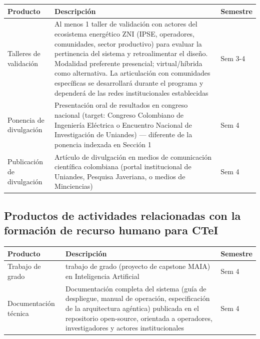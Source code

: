 \documentclass[12pt,letterpaper]{article}
\begin{document}
\begin{longtable}{>{\raggedright\arraybackslash}p{3.5cm} >{\raggedright\arraybackslash}p{9cm} >{\centering\arraybackslash}p{2cm}}
\toprule
\textbf{Producto} & \textbf{Descripci\'on} & \textbf{Semestre} \\
\midrule
\endhead
Talleres de validaci\'on & Al menos 1 taller de validaci\'on con actores del ecosistema energ\'etico ZNI (IPSE, operadores, comunidades, sector productivo) para evaluar la pertinencia del sistema y retroalimentar el dise\~no. Modalidad preferente presencial; virtual/h\'ibrida como alternativa. La articulaci\'on con comunidades espec\'ificas se desarrollar\'a durante el programa y depender\'a de las redes institucionales establecidas & Sem 3-4 \\
\midrule
Ponencia de divulgaci\'on & Presentaci\'on oral de resultados en congreso nacional (target: Congreso Colombiano de Ingenier\'ia El\'ectrica o Encuentro Nacional de Investigaci\'on de Uniandes) --- diferente de la ponencia indexada en Secci\'on 1 & Sem 4 \\
\midrule
Publicaci\'on de divulgaci\'on & Art\'iculo de divulgaci\'on en medios de comunicaci\'on cient\'ifica colombiana (portal institucional de Uniandes, Pesquisa Javeriana, o medios de Minciencias) & Sem 4 \\
\bottomrule
\end{longtable}

\subsection{Productos de actividades relacionadas con la formaci\'on de recurso humano para CTeI}

\begin{longtable}{>{\raggedright\arraybackslash}p{3.5cm} >{\raggedright\arraybackslash}p{9cm} >{\centering\arraybackslash}p{2cm}}
\toprule
\textbf{Producto} & \textbf{Descripci\'on} & \textbf{Semestre} \\
\midrule
\endhead
Trabajo de grado & 1 trabajo de grado (proyecto de capstone MAIA) en Inteligencia Artificial & Sem 4 \\
\midrule
Documentaci\'on t\'ecnica & Documentaci\'on completa del sistema (gu\'ia de despliegue, manual de operaci\'on, especificaci\'on de la arquitectura ag\'entica) publicada en el repositorio open-source, orientada a operadores, investigadores y actores institucionales & Sem 4 \\
\bottomrule
\end{longtable}
\end{document}
